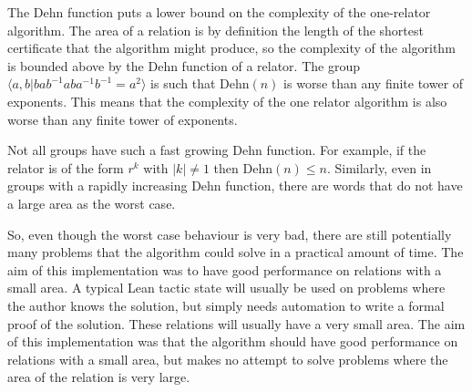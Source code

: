 \documentclass[11pt]{article} %
\theoremstyle{definition}
\theoremstyle{definition}
\theoremstyle{definition}
\theoremstyle{definition}
\theoremstyle{definition}
\theoremstyle{definition}
\begin{document}
  The Dehn function puts a lower bound on the complexity of the one-relator algorithm.
  The area of a relation is by definition the length of the shortest certificate
  that the algorithm might produce, so the complexity of the algorithm is bounded above by
  the Dehn function of a relator.
  The group $\langle a, b | b a b^{-1} a b a^{-1} b^{-1} = a^2\rangle$ is such that
  $\text{Dehn}(n)$ is worse than any finite tower of exponents. This means that the
  complexity of the one relator algorithm is also worse than any finite tower of
  exponents.

  Not all groups have such a fast growing Dehn function. For example, if the relator
  is of the form $r^k$ with $|k| \ne 1$ then $\text{Dehn}(n) \le n$.
  Similarly, even in groups with a rapidly increasing Dehn function,
  there are words that do not have a large area as the worst case.

  So, even though the worst case behaviour is very bad, there are still potentially many
  problems that the algorithm could solve in a practical amount of time. The aim of this
  implementation was to have good performance on relations with a small area.
  A typical Lean tactic state will usually be used on problems where the author knows
  the solution, but simply needs automation to write a formal proof of the solution.
  These relations will usually have a very small area. The aim of this implementation
  was that the algorithm should have good performance on relations with a small area,
  but makes no attempt to solve problems where the area of the relation is very large.


\end{document}
